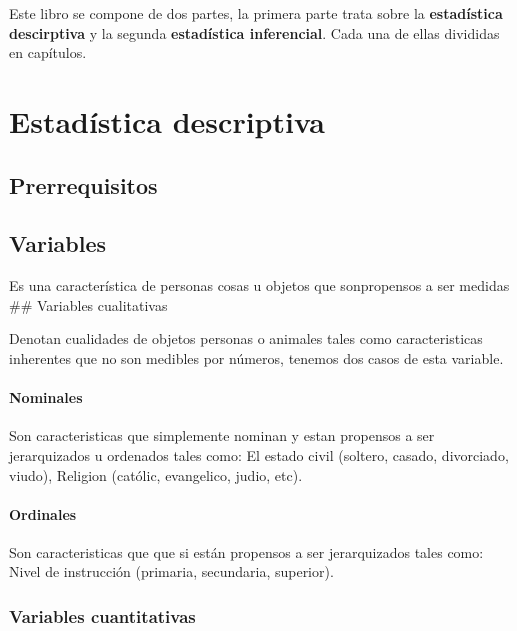 \documentclass[10pt,]{krantz}
\theoremstyle{definition}
\theoremstyle{definition}
\theoremstyle{definition}
\theoremstyle{remark}
\begin{document}
Este libro se compone de dos partes, la primera parte trata sobre la \textbf{estadística descirptiva} y la segunda \textbf{estadística inferencial}. Cada una de ellas divididas en capítulos.

\mainmatter

\hypertarget{part-estaduxedstica-descriptiva}{%
\part{Estadística descriptiva}\label{part-estaduxedstica-descriptiva}}

\hypertarget{prerrequisitos}{%
\chapter{Prerrequisitos}\label{prerrequisitos}}

\hypertarget{variables}{%
\chapter{Variables}\label{variables}}

Es una característica de personas cosas u objetos que sonpropensos a ser medidas
\#\# Variables cualitativas

Denotan cualidades de objetos personas o animales tales como caracteristicas inherentes que no son medibles por números, tenemos dos casos de esta variable.

\hypertarget{nominales}{%
\subsection{Nominales}\label{nominales}}

Son caracteristicas que simplemente nominan y estan propensos a ser jerarquizados u ordenados tales como: El estado civil (soltero, casado, divorciado, viudo), Religion (católic, evangelico, judio, etc).

\hypertarget{ordinales}{%
\subsection{Ordinales}\label{ordinales}}

Son caracteristicas que que si están propensos a ser jerarquizados tales como: Nivel de instrucción (primaria, secundaria, superior).

\hypertarget{variables-cuantitativas}{%
\section{Variables cuantitativas}\label{variables-cuantitativas}}
\end{document}
